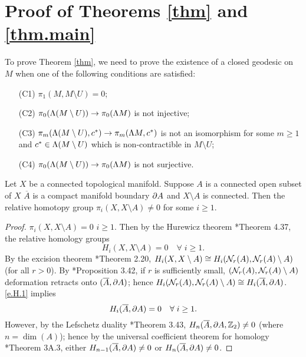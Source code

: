 \documentclass[11pt,twoside]{article}
\begin{document}
\section{Proof of Theorems \ref{thm} and \ref{thm.main}}
To prove Theorem \ref{thm}, we need to prove the existence of a closed geodesic on $M$ when one of the following conditions are satisfied:
\begin{itemize}
	\item[(C1)] \(\pi_1(M,M\setminus U)=0\);
	\item[(C2)] \(\pi_0(\Lambda(M\setminus U))\rightarrow \pi_0(\Lambda M)\) is not injective;
	\item[(C3)] \(\pi_m(\Lambda (M\setminus U), c^*)\rightarrow \pi_m(\Lambda M, c^*)\) is not an isomorphism for some \(m\geq 1\) and \(c^* \in \Lambda (M\setminus U)\) which is non-contractible in $M\setminus U$;
	\item[(C4)] \(\pi_0(\Lambda(M\setminus U))\rightarrow \pi_0(\Lambda M)\) is not surjective.
\end{itemize}
\begin{lem}\label{l.pi.k}
Let \(X\) be a connected topological manifold. Suppose \(A\) is a connected open subset of \(X\) \sot \(\overline{A}\) is a compact manifold \w boundary \(\partial A\) and \(X\setminus A\) is connected. Then the relative homotopy group \(\pi_i(X,X\setminus A)\neq 0\) for some \(i\geq 1.\)
\end{lem}
\begin{proof}
\sps \(\pi_i(X,X\setminus A)= 0\) \fa \(i\geq 1.\) Then by the Hurewicz theorem \cite{Hat}*{Theorem 4.37}, the relative homology groups
\begin{equation}\label{e.H.1}
H_i(X, X \setminus A)=0\quad \forall\; i\geq 1.
\end{equation}
By the excision theorem \cite{Hat}*{Theorem 2.20}, $H_i(X, X \setminus A)\cong H_i(\mathcal{N}_r(A),\mathcal{N}_r(A)\setminus A)$ (for all $r>0$). By \cite{Hat}*{Proposition 3.42}, if $r$ is sufficiently small, \((\mathcal{N}_r(A),\mathcal{N}_r(A)\setminus A)\) deformation retracts onto \((\overline{A},\partial A)\); hence \(H_i(\mathcal{N}_r(A),\mathcal{N}_r(A)\setminus A) \cong H_i(\overline{A},\partial A)\). \tf \eqref{e.H.1} implies
\begin{equation}
H_i(\overline{A},\partial A)=0\quad \forall\; i\geq 1.
\end{equation}
However, by the Lefschetz duality \cite{Hat}*{Theorem 3.43}, \(H_n(\overline{A},\partial A,\mathbb{Z}_2)\neq 0\) (where $n=\dim(A)$); hence by the universal coefficient theorem for homology \cite{Hat}*{Theorem 3A.3}, either \(H_{n-1}(\overline{A},\partial A)\neq 0\) or \(H_n(\overline{A},\partial A)\neq 0\).
\end{proof}
\end{document}
